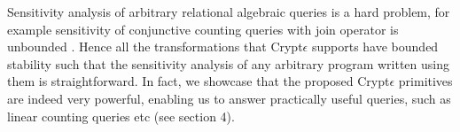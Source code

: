Sensitivity analysis of arbitrary relational algebraic queries is a hard problem, for example sensitivity of conjunctive counting queries with join operator is unbounded \cite{sensitivity}. Hence all the transformations that Crypt$\epsilon$ supports have bounded stability \cite{PINQ} such that the sensitivity analysis of any arbitrary program written using them is straightforward. In fact, we showcase that the proposed Crypt$\epsilon$ primitives are indeed very powerful, enabling us to answer practically useful queries, such as linear counting queries etc (see section 4). 








